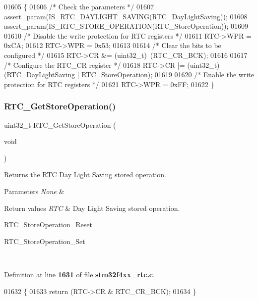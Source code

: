 \begin{DoxyCode}
01605 \{
01606   \textcolor{comment}{/* Check the parameters */}
01607   assert_param(IS_RTC_DAYLIGHT_SAVING(RTC\_DayLightSaving));
01608   assert_param(IS_RTC_STORE_OPERATION(RTC\_StoreOperation));
01609 
01610   \textcolor{comment}{/* Disable the write protection for RTC registers */}
01611   RTC->WPR = 0xCA;
01612   RTC->WPR = 0x53;
01613 
01614   \textcolor{comment}{/* Clear the bits to be configured */}
01615   RTC->CR &= (uint32\_t)~(RTC_CR_BCK);
01616 
01617   \textcolor{comment}{/* Configure the RTC\_CR register */}
01618   RTC->CR |= (uint32\_t)(RTC\_DayLightSaving | RTC\_StoreOperation);
01619 
01620   \textcolor{comment}{/* Enable the write protection for RTC registers */}
01621   RTC->WPR = 0xFF; 
01622 \}
\end{DoxyCode}
\mbox{\label{group__RTC__Group5_gaba0c1361790203e9dca43846f0d9bc15}} 
\subsubsection{R\+T\+C\+\_\+\+Get\+Store\+Operation()}
{\footnotesize\ttfamily uint32\+\_\+t R\+T\+C\+\_\+\+Get\+Store\+Operation (\begin{DoxyParamCaption}\item[{void}]{ }\end{DoxyParamCaption})}



Returns the R\+TC Day Light Saving stored operation. 


\begin{DoxyParams}{Parameters}
{\em None} & \\
\hline
\end{DoxyParams}

\begin{DoxyRetVals}{Return values}
{\em R\+TC} & Day Light Saving stored operation.
\begin{DoxyItemize}
\item R\+T\+C\+\_\+\+Store\+Operation\+\_\+\+Reset
\item R\+T\+C\+\_\+\+Store\+Operation\+\_\+\+Set 
\end{DoxyItemize}\\
\hline
\end{DoxyRetVals}


Definition at line \textbf{ 1631} of file \textbf{ stm32f4xx\+\_\+rtc.\+c}.


\begin{DoxyCode}
01632 \{
01633   \textcolor{keywordflow}{return} (RTC->CR & RTC_CR_BCK);
01634 \}
\end{DoxyCode}
